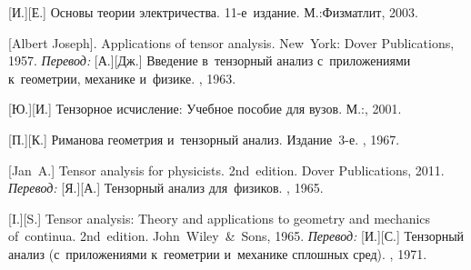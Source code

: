 \begin{thebibliography}{123}
\begin{otherlanguage}{russian}
[И.][Е.] %
Основы теории электричества. 11\hbox{-}е~издание. М.:\;Физматлит, 2003.

%
%



[Albert Joseph]. Applications of tensor analysis. New~York: Dover Publications, 1957. 
\emph{Перевод:} [А.][Дж.] Введение в~тензорный анализ с~приложениями к~геометрии, механике и~физике. \fizmatgiz, 1963. 

[Ю.][И.]
Тензорное исчисление: Учебное пособие для вузов.
М.:\;, 2001.

[П.][К.]
Риманова геометрия и~тензорный анализ.
Издание~3\hbox{-}е. \naukapublisher, 1967.

[Jan~A.] Tensor analysis for physicists. 2nd~edition. Dover Publications, 2011. 
\emph{Перевод:} [Я.][А.] Тензорный анализ для~физиков. \naukapublisher, 1965. 

[I.][S.] Tensor analysis: Theory and applications to geometry and mechanics of~continua. 2nd~edition. John~Wiley~\&~Sons, 1965. 
\emph{Перевод:} [И.][С.] Тензорный анализ (с~приложениями к~геометрии и~механике сплошных сред). \naukapublisher, 1971. 

%
%


\end{otherlanguage}
\end{thebibliography}
